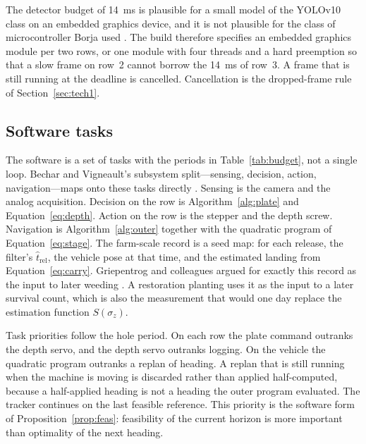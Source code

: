The detector budget of \SI{14}{ms} is plausible for a small model of the YOLOv10 class on an embedded graphics device, and it is not plausible for the class of microcontroller Borja used \cite{wang2024yolov10,borja2021}. The build therefore specifies an embedded graphics module per two rows, or one module with four threads and a hard preemption so that a slow frame on row~2 cannot borrow the \SI{14}{ms} of row~3. A frame that is still running at the deadline is cancelled. Cancellation is the dropped-frame rule of Section~\ref{sec:tech1}.

\subsection{Software tasks}

The software is a set of tasks with the periods in Table~\ref{tab:budget}, not a single loop. Bechar and Vigneault's subsystem split---sensing, decision, action, navigation---maps onto these tasks directly \cite{bechar2016}. Sensing is the camera and the analog acquisition. Decision on the row is Algorithm~\ref{alg:plate} and Equation~\eqref{eq:depth}. Action on the row is the stepper and the depth screw. Navigation is Algorithm~\ref{alg:outer} together with the quadratic program of Equation~\eqref{eq:stage}. The farm-scale record is a seed map: for each release, the filter's \(\hat{t}_{\mathrm{rel}}\), the vehicle pose at that time, and the estimated landing from Equation~\eqref{eq:carry}. Griepentrog and colleagues argued for exactly this record as the input to later weeding \cite{griepentrog2005}. A restoration planting uses it as the input to a later survival count, which is also the measurement that would one day replace the estimation function \(S(\sigma_z)\).

Task priorities follow the hole period. On each row the plate command outranks the depth servo, and the depth servo outranks logging. On the vehicle the quadratic program outranks a replan of heading. A replan that is still running when the machine is moving is discarded rather than applied half-computed, because a half-applied heading is not a heading the outer program evaluated. The tracker continues on the last feasible reference. This priority is the software form of Proposition~\ref{prop:feas}: feasibility of the current horizon is more important than optimality of the next heading.

